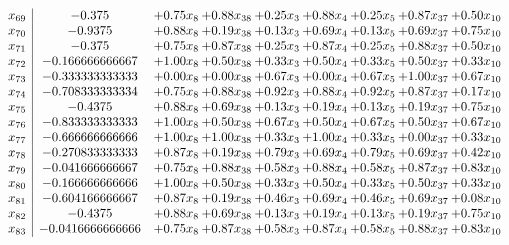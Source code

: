 \documentclass[8pt]{article}
\begin{document}
\[\begin{array}{c| c c@{\hskip 2pt} c@{\hskip 2pt} c@{\hskip 2pt} c@{\hskip 2pt} c@{\hskip 2pt} c@{\hskip 2pt} c@{\hskip 2pt} }
 x_{69}   &  -0.375 & +  0.75 x_{8} & +  0.88 x_{38} & +  0.25 x_{3} & +  0.88 x_{4} & +  0.25 x_{5} & +  0.87 x_{37} & +  0.50 x_{10}\\
 x_{70}   &  -0.9375 & +  0.88 x_{8} & +  0.19 x_{38} & +  0.13 x_{3} & +  0.69 x_{4} & +  0.13 x_{5} & +  0.69 x_{37} & +  0.75 x_{10}\\
 x_{71}   &  -0.375 & +  0.75 x_{8} & +  0.87 x_{38} & +  0.25 x_{3} & +  0.87 x_{4} & +  0.25 x_{5} & +  0.88 x_{37} & +  0.50 x_{10}\\
 x_{72}   &  -0.166666666667 & +  1.00 x_{8} & +  0.50 x_{38} & +  0.33 x_{3} & +  0.50 x_{4} & +  0.33 x_{5} & +  0.50 x_{37} & +  0.33 x_{10}\\
 x_{73}   &  -0.333333333333 & +  0.00 x_{8} & +  0.00 x_{38} & +  0.67 x_{3} & +  0.00 x_{4} & +  0.67 x_{5} & +  1.00 x_{37} & +  0.67 x_{10}\\
 x_{74}   &  -0.708333333334 & +  0.75 x_{8} & +  0.88 x_{38} & +  0.92 x_{3} & +  0.88 x_{4} & +  0.92 x_{5} & +  0.87 x_{37} & +  0.17 x_{10}\\
 x_{75}   &  -0.4375 & +  0.88 x_{8} & +  0.69 x_{38} & +  0.13 x_{3} & +  0.19 x_{4} & +  0.13 x_{5} & +  0.19 x_{37} & +  0.75 x_{10}\\
 x_{76}   &  -0.833333333333 & +  1.00 x_{8} & +  0.50 x_{38} & +  0.67 x_{3} & +  0.50 x_{4} & +  0.67 x_{5} & +  0.50 x_{37} & +  0.67 x_{10}\\
 x_{77}   &  -0.666666666666 & +  1.00 x_{8} & +  1.00 x_{38} & +  0.33 x_{3} & +  1.00 x_{4} & +  0.33 x_{5} & +  0.00 x_{37} & +  0.33 x_{10}\\
 x_{78}   &  -0.270833333333 & +  0.87 x_{8} & +  0.19 x_{38} & +  0.79 x_{3} & +  0.69 x_{4} & +  0.79 x_{5} & +  0.69 x_{37} & +  0.42 x_{10}\\
 x_{79}   &  -0.041666666667 & +  0.75 x_{8} & +  0.88 x_{38} & +  0.58 x_{3} & +  0.88 x_{4} & +  0.58 x_{5} & +  0.87 x_{37} & +  0.83 x_{10}\\
 x_{80}   &  -0.166666666666 & +  1.00 x_{8} & +  0.50 x_{38} & +  0.33 x_{3} & +  0.50 x_{4} & +  0.33 x_{5} & +  0.50 x_{37} & +  0.33 x_{10}\\
 x_{81}   &  -0.604166666667 & +  0.87 x_{8} & +  0.19 x_{38} & +  0.46 x_{3} & +  0.69 x_{4} & +  0.46 x_{5} & +  0.69 x_{37} & +  0.08 x_{10}\\
 x_{82}   &  -0.4375 & +  0.88 x_{8} & +  0.69 x_{38} & +  0.13 x_{3} & +  0.19 x_{4} & +  0.13 x_{5} & +  0.19 x_{37} & +  0.75 x_{10}\\
 x_{83}   &  -0.0416666666666 & +  0.75 x_{8} & +  0.87 x_{38} & +  0.58 x_{3} & +  0.87 x_{4} & +  0.58 x_{5} & +  0.88 x_{37} & +  0.83 x_{10}\\

\end{array}\]
\end{document}
